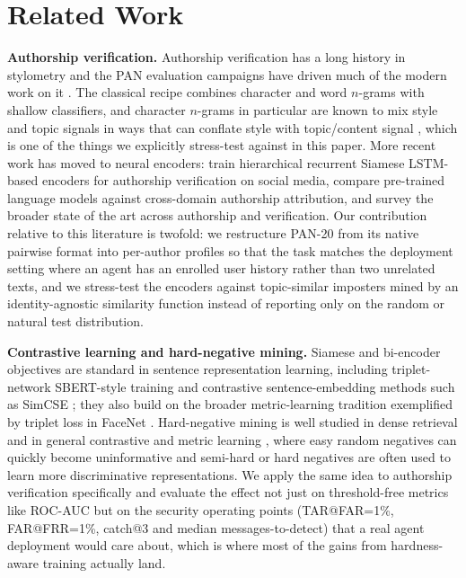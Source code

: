 \documentclass[11pt]{article}
\begin{document}
\section{Related Work}

\noindent\textbf{Authorship verification.} Authorship verification has a long history in stylometry and the PAN evaluation campaigns have driven much of the modern work on it \citep{stamatatos2009survey,bevendorff2020overview}. The classical recipe combines character and word $n$-grams with shallow classifiers, and character $n$-grams in particular are known to mix style and topic signals in ways that can conflate style with topic/content signal \citep{sapkota2015notall}, which is one of the things we explicitly stress-test against in this paper. More recent work has moved to neural encoders: \citet{boenninghoff2019similarity} train hierarchical recurrent Siamese LSTM-based encoders for authorship verification on social media, \citet{barlas2020crossdomain} compare pre-trained language models against cross-domain authorship attribution, and \citet{tyo2022state} survey the broader state of the art across authorship and verification. Our contribution relative to this literature is twofold: we restructure PAN-20 from its native pairwise format into per-author profiles so that the task matches the deployment setting where an agent has an enrolled user history rather than two unrelated texts, and we stress-test the encoders against topic-similar imposters mined by an identity-agnostic similarity function instead of reporting only on the random or natural test distribution.

\noindent\textbf{Contrastive learning and hard-negative mining.} Siamese and bi-encoder objectives are standard in sentence representation learning, including triplet-network SBERT-style training \citep{reimers2019sentencebert} and contrastive sentence-embedding methods such as SimCSE \citep{gao2021simcse}; they also build on the broader metric-learning tradition exemplified by triplet loss in FaceNet \citep{schroff2015facenet}. Hard-negative mining is well studied in dense retrieval \citep{xiong2021ance} and in general contrastive and metric learning \citep{robinson2021hard,schroff2015facenet}, where easy random negatives can quickly become uninformative and semi-hard or hard negatives are often used to learn more discriminative representations. We apply the same idea to authorship verification specifically and evaluate the effect not just on threshold-free metrics like ROC-AUC but on the security operating points (TAR@FAR=1\%, FAR@FRR=1\%, catch@3 and median messages-to-detect) that a real agent deployment would care about, which is where most of the gains from hardness-aware training actually land.
\end{document}
